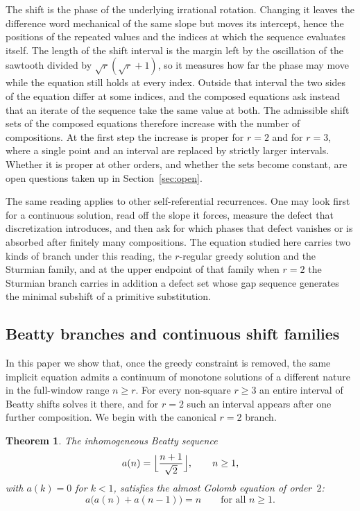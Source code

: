 \documentclass{birkjour}
\newtheorem{theorem}{Theorem}
\theoremstyle{definition}
\theoremstyle{remark}
\begin{document}
The shift is the phase of the underlying irrational rotation.
Changing it leaves the difference word mechanical of the same
slope but moves its intercept, hence the positions of the
repeated values and the indices at which the sequence
evaluates itself. The length of the shift interval is the
margin left by the oscillation of the sawtooth divided by
$\sqrt{r}(\sqrt{r}+1)$, so it measures how far the phase may
move while the equation still holds at every index. Outside
that interval the two sides of the equation differ at some
indices, and the composed equations ask instead that an
iterate of the sequence take the same value at both.
The admissible
shift sets of the composed equations therefore increase with
the number of compositions. At the first step the increase is
proper for $r=2$ and for $r=3$, where a single point and an
interval are replaced by strictly larger intervals. Whether
it is proper at other orders, and whether the sets become
constant, are open questions taken up in
Section~\ref{sec:open}.

The same reading applies to other self-referential
recurrences. One may look first for a continuous solution,
read off the slope it forces, measure the defect that
discretization introduces, and then ask for which phases that
defect vanishes or is absorbed after finitely many
compositions. The equation studied here carries two kinds of
branch under this reading, the $r$-regular greedy solution
and the Sturmian family, and at the upper endpoint of that
family when $r=2$ the Sturmian branch carries in addition a
defect set whose gap sequence generates the minimal subshift
of a primitive substitution.

\subsection{Beatty branches and continuous shift families}

In this paper we show that, once the greedy constraint
is removed, the same implicit equation admits a continuum
of monotone solutions of a different nature in the
full-window range $n\ge r$. For every non-square $r\ge 3$
an entire interval of Beatty shifts solves it there, and
for $r=2$ such an interval appears after one further
composition. We begin with the canonical $r=2$ branch.

\begin{theorem}\label{thm:canonical}
The inhomogeneous Beatty sequence
\begin{equation}\label{eq:canonical}
  a(n)=\Bigl\lfloor\frac{n+1}{\sqrt{2}}\Bigr\rfloor,
  \qquad n\ge 1,
\end{equation}
with $a(k)=0$ for $k<1$,
satisfies the almost Golomb equation of order~$2$:
\begin{equation}\label{eq:strong}
  a\bigl(a(n)+a(n{-}1)\bigr)=n
  \qquad\text{for all } n\ge 1.
\end{equation}
\end{theorem}
\end{document}
